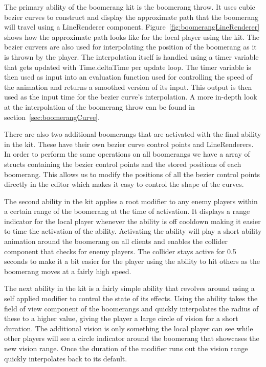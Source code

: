The primary ability of the boomerang kit is the boomerang throw. It uses cubic bezier curves to construct and display the approximate path that the boomerang will travel using a LineRenderer component. Figure~\ref{fig:boomerangLineRenderer} shows how the approximate path looks like for the local player using the kit. 
The bezier curvers are also used for interpolating the position of the boomerang as it is thrown by the player. The interpolation itself is handled using a timer variable that gets updated with Time.deltaTime per update loop. The timer variable is then used as input into an evaluation function used for controlling the speed of the animation and returns a smoothed version of its input. This output is then used as the input time for the bezier curve's interpolation. A more in-depth look at the interpolation of the boomerang throw can be found in section~\ref{sec:boomerangCurve}. 
    
There are also two additional boomerangs that are activated with the final ability in the kit. These have their own bezier curve control points and LineRenderers.
In order to perform the same operations on all boomerangs we have a array of structs containing the bezier control points and the stored positions of each boomerang. This allows us to modify the positions of all the bezier control points directly in the editor which makes it easy to control the shape of the curves.  

The second ability in the kit applies a root modifier to any enemy players within a certain range of the boomerang at the time of activation. It displays a range indicator for the local player whenever the ability is off cooldown making it easier to time the activation of the ability. Activating the ability will play a short ability animation around the boomerang on all clients and enables the collider component that checks for enemy players. The collider stays active for 0.5 seconds to make it a bit easier for the player using the ability to hit others as the boomerang moves at a fairly high speed. 
    
The next ability in the kit is a fairly simple ability that revolves around using a self applied modifier to control the state of its effects. Using the ability takes the field of view component of the boomerangs and quickly interpolates the radius of these to a higher value, giving the player a large circle of vision for a short duration. The additional vision is only something the local player can see while other players will see a circle indicator around the boomerang that showcases the new vision range. Once the duration of the modifier runs out the vision range quickly interpolates back to its default. 

